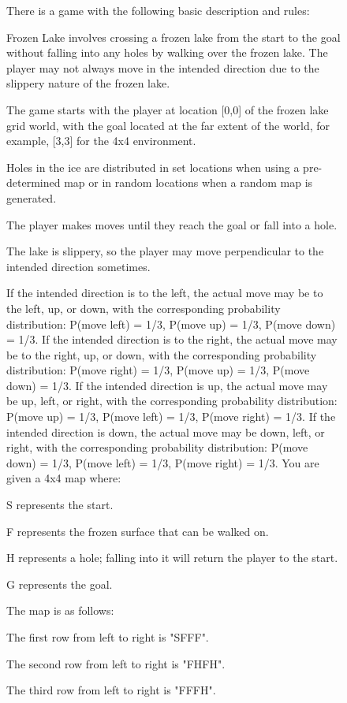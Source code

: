 \documentclass{article}
\begin{document}
\begin{figure}
\begin{mdframed}[roundcorner=10pt]
There is a game with the following basic description and rules:

Frozen Lake involves crossing a frozen lake from the start to the goal without falling into any holes by walking over the frozen lake. The player may not always move in the intended direction due to the slippery nature of the frozen lake.

The game starts with the player at location [0,0] of the frozen lake grid world, with the goal located at the far extent of the world, for example, [3,3] for the 4x4 environment.

Holes in the ice are distributed in set locations when using a pre-determined map or in random locations when a random map is generated.

The player makes moves until they reach the goal or fall into a hole.

The lake is slippery, so the player may move perpendicular to the intended direction sometimes.

If the intended direction is to the left, the actual move may be to the left, up, or down, with the corresponding probability distribution: P(move left) = 1/3, P(move up) = 1/3, P(move down) = 1/3.
If the intended direction is to the right, the actual move may be to the right, up, or down, with the corresponding probability distribution: P(move right) = 1/3, P(move up) = 1/3, P(move down) = 1/3.
If the intended direction is up, the actual move may be up, left, or right, with the corresponding probability distribution: P(move up) = 1/3, P(move left) = 1/3, P(move right) = 1/3.
If the intended direction is down, the actual move may be down, left, or right, with the corresponding probability distribution: P(move down) = 1/3, P(move left) = 1/3, P(move right) = 1/3.
You are given a 4x4 map where:

S represents the start.

F represents the frozen surface that can be walked on.

H represents a hole; falling into it will return the player to the start.

G represents the goal.

The map is as follows:

The first row from left to right is "SFFF".

The second row from left to right is "FHFH".

The third row from left to right is "FFFH".


\end{mdframed}
\end{figure}
\end{document}
